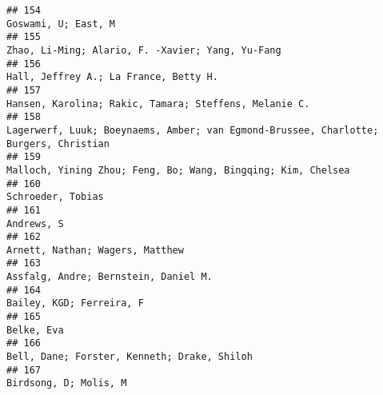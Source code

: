 \documentclass[
  english,
  man]{apa6}
\begin{document}
\begin{verbatim}
## 154                                                                                                                                                                      Goswami, U; East, M
## 155                                                                                                                                         Zhao, Li-Ming; Alario, F. -Xavier; Yang, Yu-Fang
## 156                                                                                                                                                    Hall, Jeffrey A.; La France, Betty H.
## 157                                                                                                                                    Hansen, Karolina; Rakic, Tamara; Steffens, Melanie C.
## 158                                                                                                     Lagerwerf, Luuk; Boeynaems, Amber; van Egmond-Brussee, Charlotte; Burgers, Christian
## 159                                                                                                                             Malloch, Yining Zhou; Feng, Bo; Wang, Bingqing; Kim, Chelsea
## 160                                                                                                                                                                        Schroeder, Tobias
## 161                                                                                                                                                                               Andrews, S
## 162                                                                                                                                                          Arnett, Nathan; Wagers, Matthew
## 163                                                                                                                                                     Assfalg, Andre; Bernstein, Daniel M.
## 164                                                                                                                                                                 Bailey, KGD; Ferreira, F
## 165                                                                                                                                                                               Belke, Eva
## 166                                                                                                                                              Bell, Dane; Forster, Kenneth; Drake, Shiloh
## 167                                                                                                                                                                    Birdsong, D; Molis, M

\end{verbatim}
\end{document}
